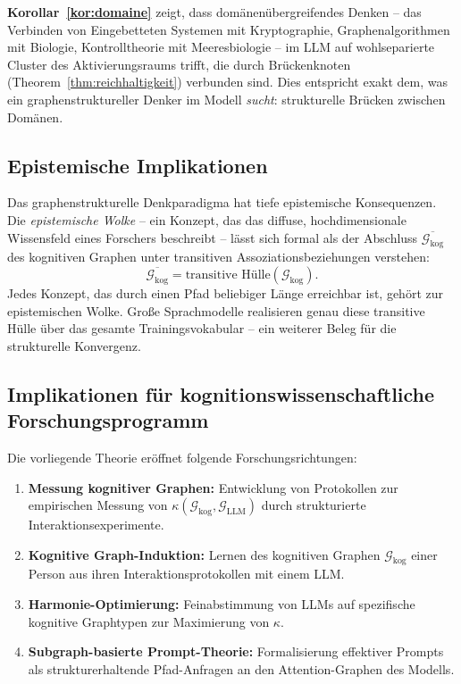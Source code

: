 ﻿\documentclass[12pt,a4paper]{article}
\theoremstyle{plain}
\theoremstyle{definition}
\theoremstyle{remark}
\newcommand{\GG}{\mathcal{G}}
\begin{document}
\textbf{Korollar~\ref{kor:domaine}} zeigt, dass domänenübergreifendes Denken -- das Verbinden von Eingebetteten Systemen mit Kryptographie, Graphenalgorithmen mit Biologie, Kontrolltheorie mit Meeresbiologie -- im LLM auf wohlseparierte Cluster des Aktivierungsraums trifft, die durch Brückenknoten (Theorem~\ref{thm:reichhaltigkeit}) verbunden sind. Dies entspricht exakt dem, was ein graphenstruktureller Denker im Modell \emph{sucht}: strukturelle Brücken zwischen Domänen.

\subsection{Epistemische Implikationen}

Das graphenstrukturelle Denkparadigma hat tiefe epistemische Konsequenzen. Die \emph{epistemische Wolke} -- ein Konzept, das das diffuse, hochdimensionale Wissensfeld eines Forschers beschreibt -- lässt sich formal als der Abschluss $\overline{\GG_{\text{kog}}}$ des kognitiven Graphen unter transitiven Assoziationsbeziehungen verstehen:
\[
  \overline{\GG_{\text{kog}}} = \text{transitive Hülle}(\GG_{\text{kog}}).
\]
Jedes Konzept, das durch einen Pfad beliebiger Länge erreichbar ist, gehört zur epistemischen Wolke. Große Sprachmodelle realisieren genau diese transitive Hülle über das gesamte Trainingsvokabular -- ein weiterer Beleg für die strukturelle Konvergenz.

\subsection{Implikationen für kognitionswissenschaftliche Forschungsprogramm}

Die vorliegende Theorie eröffnet folgende Forschungsrichtungen:

\begin{enumerate}
  \item \textbf{Messung kognitiver Graphen:} Entwicklung von Protokollen zur empirischen Messung von $\kappa(\GG_{\text{kog}}, \GG_{\text{LLM}})$ durch strukturierte Interaktionsexperimente.

  \item \textbf{Kognitive Graph-Induktion:} Lernen des kognitiven Graphen $\GG_{\text{kog}}$ einer Person aus ihren Interaktionsprotokollen mit einem LLM.

  \item \textbf{Harmonie-Optimierung:} Feinabstimmung von LLMs auf spezifische kognitive Graphtypen zur Maximierung von $\kappa$.

  \item \textbf{Subgraph-basierte Prompt-Theorie:} Formalisierung effektiver Prompts als strukturerhaltende Pfad-Anfragen an den Attention-Graphen des Modells.
\end{enumerate}
\end{document}
